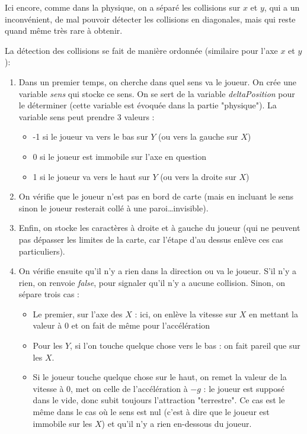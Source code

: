 \documentclass[12pt]{article}
\begin{document}
		Ici encore, comme dans la physique, on a séparé les collisions sur \(x\) et \(y\), qui a un inconvénient, de mal pouvoir détecter les collisions en diagonales, mais qui reste quand même très rare à obtenir.
		
		La détection des collisions se fait de manière ordonnée (similaire pour l'axe \(x\) et \(y\)):
		\begin{enumerate}
			\item Dans un premier temps, on cherche dans quel sens va le joueur. On crée une variable \textit{sens} qui stocke ce sens. On se sert de la variable \textit{deltaPosition} pour le déterminer (cette variable est évoquée dans la partie "physique"). La variable sens peut prendre 3 valeurs : 
			\begin{itemize}
				\item -1 si le joueur va vers le bas sur \(Y\) (ou vers la gauche sur \(X\))
				\item 0 si le joueur est immobile sur l'axe en question
				\item 1 si le joueur va vers le haut sur \(Y\) (ou vers la droite sur \(X\))
			\end{itemize} 
			\item On vérifie que le joueur n'est pas en bord de carte (mais en incluant le sens sinon le joueur resterait collé à une paroi\dots invisible).
			\item Enfin, on stocke les caractères à droite et à gauche du joueur (qui ne peuvent pas dépasser les limites de la carte, car l'étape d'au dessus enlève ces cas particuliers).
			\item On vérifie ensuite qu'il n'y a rien dans la direction ou va le joueur. S'il n'y a rien, on renvoie \textit{false}, pour signaler qu'il n'y a aucune collision.
			Sinon, on sépare trois cas :
			\begin{itemize}
				\item Le premier, sur l'axe des \(X\) : ici, on enlève la vitesse sur \(X\) en mettant la valeur à 0 et on fait de même pour l'accélération
				\item Pour les \(Y\), si l'on touche quelque chose vers le bas : on fait pareil que sur les \(X\).
				\item Si le joueur touche quelque chose sur le haut, on remet la valeur de la vitesse à 0, met on celle de l'accélération à \(-g\) : le joueur est supposé dans le vide, donc subit toujours l'attraction "terrestre". Ce cas est le même dans le cas où le sens est nul (c'est à dire que le joueur est immobile sur les \(X\)) et qu'il n'y a rien en-dessous du joueur.
			\end{itemize}
		\end{enumerate}
	
\end{document}
